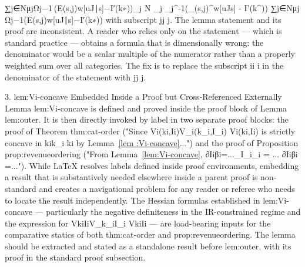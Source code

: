 ∑j∈NμjΩj−1 ⁣(E(s,j)w[uJ∣s]−I′(k∗))\sum_{j \in N} \mu_j \Omega_j^{-1}\!\left(_{(s,j)}^w[uJ\mid s] - I'(k^\ast)\right)
∑j∈N​μj​Ωj−1​(E(s,j)w​[uJ∣s]−I′(k∗))
with subscript jj
j. The lemma statement and its proof are inconsistent. A reader who relies only on the statement — which is standard practice — obtains a formula that is dimensionally wrong: the denominator would be a scalar multiple of the numerator rather than a properly weighted sum over all categories. The fix is to replace the subscript ii
i in the denominator of the statement with jj
j.


3. lem:Vi-concave Embedded Inside a Proof but Cross-Referenced Externally
Lemma lem:Vi-concave is defined and proved inside the proof block of Lemma lem:outer. It is then directly invoked by label in two separate proof blocks: the proof of Theorem thm:cat-order ("Since Vi(ki,Ii)V_i(k_i,I_i)
Vi​(ki​,Ii​) is strictly concave in kik_i
ki​ by Lemma~\ref{lem
:Vi-concave}...") and the proof of Proposition prop:revenueordering ("From Lemma~\ref{lem:Vi-concave}, ∂Iiβi=...\partial_{I_i}\beta_i = ...
∂Ii​​βi​=..."). While LaTeX resolves labels defined inside proof environments, embedding a result that is substantively needed elsewhere inside a parent proof is non-standard and creates a navigational problem for any reader or referee who needs to locate the result independently. The Hessian formulas established in
lem:Vi-concave — particularly the negative definiteness in the IR-constrained regime and the expression for VkiIiV_{k_iI_i}
Vki​Ii​​ — are load-bearing inputs for the comparative statics of both
thm:cat-order and prop:revenueordering. The lemma should be extracted and stated as a standalone result before lem:outer, with its proof in the standard proof subsection.

